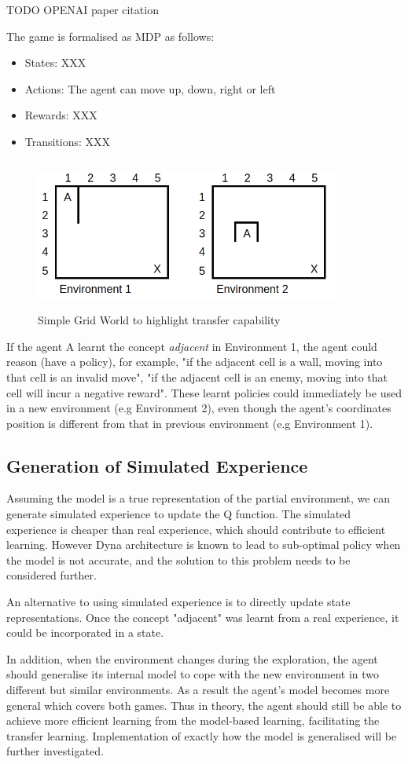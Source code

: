 TODO OPENAI paper citation

The game is formalised as MDP as follows:

\begin{itemize}

\item States: XXX
\item Actions: The agent can move up, down, right or left
\item Rewards: XXX
\item Transitions: XXX

\end{itemize}


\begin{figure}[!htb]
\centering
\includegraphics[width=10cm, height=5cm]{./figures/grid_world}
\caption{Simple Grid World to highlight transfer capability }
\label{grid_world}
\end{figure}
If the agent A learnt the concept \textit{adjacent} in Environment 1, the agent could reason (have a policy), for example, "if the adjacent cell is a wall, moving into that cell is an invalid move", "if the adjacent cell is an enemy, 
moving into that cell will incur a negative reward". These learnt policies could immediately be used in a new environment (e.g Environment 2), even though the agent's coordinates position is different from that in previous environment (e.g Environment 1).

\subsection{Generation of Simulated Experience}
Assuming the model is  a true representation of the partial environment, we can generate simulated experience to update the Q function. The simulated experience is cheaper than real experience, 
which should contribute to efficient learning. However Dyna architecture is known to lead to sub-optimal policy when the model is not accurate, and the solution to this problem needs to be considered further.

An alternative to using simulated experience is to directly update state representations. Once the concept "adjacent"  was learnt from a real experience, it could be incorporated in a state.

In addition, when the environment changes during the exploration, the agent should generalise its internal model to cope with the new environment in two different but similar environments. 
As a result the agent's model becomes more general which covers both games. Thus in theory, the agent should still be able to achieve more efficient learning from the model-based learning, facilitating the transfer learning.
Implementation of exactly how the model is generalised will be further investigated.
